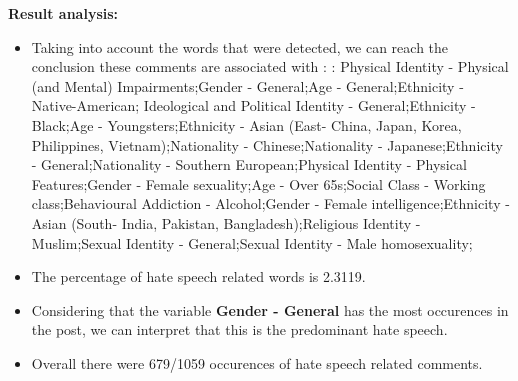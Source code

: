 \documentclass[11pt]{article}
\begin{document}
\textbf{\Large Result analysis:}

\begin{itemize}\item Taking into account the words that were detected, we can reach the conclusion these comments are associated with : : Physical Identity - Physical (and Mental) Impairments;Gender - General;Age - General;Ethnicity - Native-American; Ideological and Political Identity - General;Ethnicity - Black;Age - Youngsters;Ethnicity - Asian (East- China, Japan, Korea, Philippines, Vietnam);Nationality - Chinese;Nationality - Japanese;Ethnicity - General;Nationality - Southern European;Physical Identity - Physical Features;Gender - Female sexuality;Age - Over 65s;Social Class - Working class;Behavioural Addiction - Alcohol;Gender - Female intelligence;Ethnicity - Asian (South- India, Pakistan, Bangladesh);Religious Identity - Muslim;Sexual Identity - General;Sexual Identity - Male homosexuality;%

\item The percentage of hate speech related words is 2.3119.

\item Considering that the variable \textbf{Gender - General} has the most occurences in the post, we can interpret that this is the predominant hate speech.

\item Overall there were 679/1059 occurences of hate speech related comments.\end{itemize}
\end{document}
